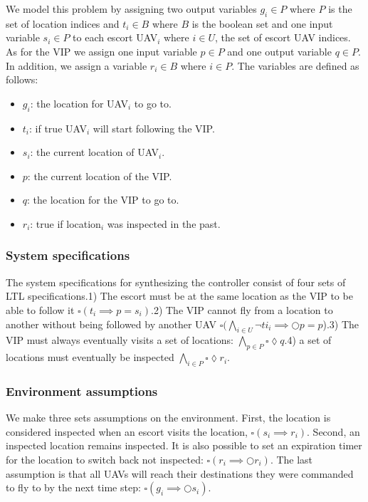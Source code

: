 \documentclass[]{article}
\begin{document}
We model this problem by assigning two output variables $g_{i} \in P$ where $P$ is the set of location indices and $t_{i}\in B$ where $B$ is the boolean set and one input variable $s_{i} \in P$ to each escort UAV$_{i}$ where $i \in U$, the set of escort UAV indices. As for the VIP we assign one input variable $p \in P$ and one output variable $q \in P$. In addition, we assign a variable $r_{i} \in B$ where $i \in P$. The variables are defined as follows:

\begin{itemize}
        \item
            $g_{i}$: the location for UAV$_{i}$ to go to.
        \item
            $t_{i}$: if true UAV$_{i}$ will start following the VIP\@.
        \item
            $s_{i}$: the current location of UAV$_{i}$.
        \item
            $p$: the current location of the VIP.
        \item
            $q$: the location for the VIP to go to.
        \item
            $r_{i}$: true if location$_{i}$ was inspected in the past.
\end{itemize}


\subsubsection{System specifications}\label{system-specifications}
The system specifications for synthesizing the controller consist of four sets of LTL specifications.1) The escort must be at the same location as the VIP to be able to follow it $\square (t_{i} \implies p = s_{i})$.2) The VIP cannot fly from a location to another without being followed by another UAV $\square(\bigwedge\limits_{i\in U}\lnot ti_{i} \implies \Circle p = p$).3) The VIP must always eventually visits a set of locations: $\bigwedge\limits_{p\in P}\square \lozenge q$.4) a set of locations must eventually be inspected $\bigwedge\limits_{i\in P}\square \lozenge r_{i}$.
\subsubsection{Environment assumptions}\label{environment-assumptions}
We make three sets assumptions on the environment. First, the location is considered inspected when an escort visits the location, $\square (s_{i} \implies r_{i})$. Second, an inspected location remains inspected. It is also possible to set an expiration timer for the location to switch back not inspected: $\square (r_{i} \implies \Circle r_{i})$. The last assumption is that all UAVs will reach their destinations they were commanded to fly to by the next time step: $\square (g_{i} \implies \Circle s_{i})$.
\end{document}
